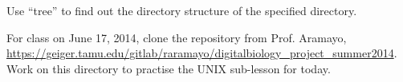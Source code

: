 Use ``tree'' to find out the directory structure of the specified directory. 

For class on June 17, 2014, clone the repository from Prof. Aramayo, \url{https://geiger.tamu.edu/gitlab/raramayo/digitalbiology_project_summer2014}. Work on this directory to practise the UNIX sub-lesson for today.




































